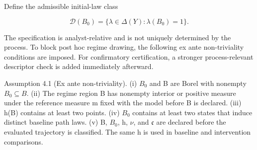 \documentclass[10pt]{article}
\begin{document}
Define the admissible initial-law class

\begin{equation}
\mathcal D(B_0)=\{\lambda\in\Delta(Y):\lambda(B_0)=1\}.
\tag{8}\label{eq:8}
\end{equation}

The specification is analyst-relative and is not uniquely determined by
the process. To block post hoc regime drawing, the following ex ante
non-triviality conditions are imposed. For confirmatory certification, a
stronger process-relevant descriptor check is added immediately
afterward.

Assumption 4.1 (Ex ante non-triviality). (i) \(B_0\) and B are Borel
with nonempty \(B_0\subseteq{}B\). (ii) The regime region B has nonempty
interior or positive measure under the reference measure m fixed with
the model before B is declared. (iii) h(B) contains at least two points.
(iv) \(B_0\) contains at least two states that induce distinct baseline
path laws. (v) B, \(B_0\), h, \(\nu\), and \(\mathfrak c\) are declared
before the evaluated trajectory is classified. The same h is used in
baseline and intervention comparisons.
\end{document}
